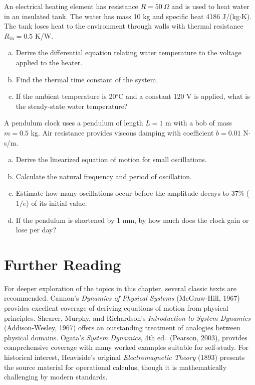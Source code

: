 \begin{exercise}
An electrical heating element has resistance $R = 50\ \Omega$ and is used to heat water in an insulated tank. The water has mass 10 kg and specific heat 4186 J/(kg$\cdot$K). The tank loses heat to the environment through walls with thermal resistance $R_{\text{th}} = 0.5$ K/W.
\begin{enumerate}[(a)]
    \item Derive the differential equation relating water temperature to the voltage applied to the heater.
    \item Find the thermal time constant of the system.
    \item If the ambient temperature is 20$^\circ$C and a constant 120 V is applied, what is the steady-state water temperature?
\end{enumerate}
\end{exercise}

\begin{exercise}
A pendulum clock uses a pendulum of length $L = 1$ m with a bob of mass $m = 0.5$ kg. Air resistance provides viscous damping with coefficient $b = 0.01$ N$\cdot$s/m.
\begin{enumerate}[(a)]
    \item Derive the linearized equation of motion for small oscillations.
    \item Calculate the natural frequency and period of oscillation.
    \item Estimate how many oscillations occur before the amplitude decays to 37\% ($1/e$) of its initial value.
    \item If the pendulum is shortened by 1 mm, by how much does the clock gain or lose per day?
\end{enumerate}
\end{exercise}


\section{Further Reading}

For deeper exploration of the topics in this chapter, several classic texts are recommended. Cannon's \textit{Dynamics of Physical Systems} (McGraw-Hill, 1967) provides excellent coverage of deriving equations of motion from physical principles. Shearer, Murphy, and Richardson's \textit{Introduction to System Dynamics} (Addison-Wesley, 1967) offers an outstanding treatment of analogies between physical domains. Ogata's \textit{System Dynamics}, 4th ed.\ (Pearson, 2003), provides comprehensive coverage with many worked examples suitable for self-study. For historical interest, Heaviside's original \textit{Electromagnetic Theory} (1893) presents the source material for operational calculus, though it is mathematically challenging by modern standards.

